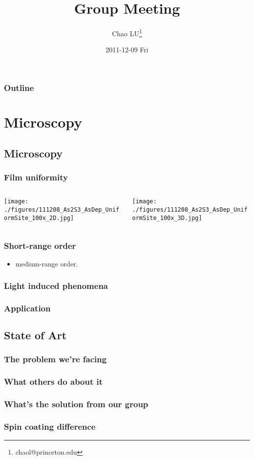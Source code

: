 \documentclass[bigger, english, 10pt, presentation]{beamer}
\title{Group Meeting}
\author{Chao LU\thanks{chaol@princeton.edu}}
\date{2011-12-09 Fri}
\begin{document}
\maketitle

\begin{frame}
\frametitle{Outline}
\setcounter{tocdepth}{3}
\tableofcontents
\end{frame}



\section{Microscopy}
\label{sec-1}
\subsection{Microscopy}
\label{sec-1-1}
\begin{frame}
\frametitle{Film uniformity}
\label{sec-1-1-1}
\begin{columns}
\begin{column}{0.5\textwidth}
\label{sec-1-1-1-1}

\texttt{[image: ./figures/111208\_As2S3\_AsDep\_UniformSite\_100x\_2D.jpg]}
\end{column}
\begin{column}{0.6\textwidth}
\begin{example}[A screenshot]
\label{sec-1-1-1-2}

\texttt{[image: ./figures/111208\_As2S3\_AsDep\_UniformSite\_100x\_3D.jpg]}
\end{example}
\end{column}
\end{columns}
\end{frame}
\begin{frame}
\frametitle{Short-range order}
\label{sec-1-1-2}

\begin{itemize}
\item medium-range order.
\end{itemize}
\end{frame}
\begin{frame}
\frametitle{Light induced phenomena}
\label{sec-1-1-3}
\end{frame}
\begin{frame}
\frametitle{Application}
\label{sec-1-1-4}
\end{frame}
\subsection{State of Art}
\label{sec-1-2}
\begin{frame}
\frametitle{The problem we're facing}
\label{sec-1-2-1}
\end{frame}
\begin{frame}
\frametitle{What others do about it}
\label{sec-1-2-2}
\end{frame}
\begin{frame}
\frametitle{What's the solution from our group}
\label{sec-1-2-3}
\end{frame}
\begin{frame}
\frametitle{Spin coating difference}
\label{sec-1-2-4}
\end{frame}
\end{document}

